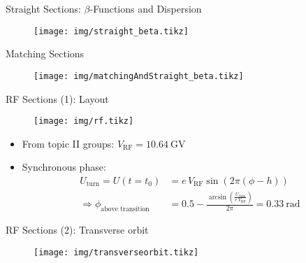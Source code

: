 \documentclass{beamer}
\begin{document}
\begin{frame}[t,fragile]{Straight Sections: $\beta$-Functions and Dispersion}
\begin{figure}
\centering
\texttt{[image: img/straight\_beta.tikz]}
\end{figure}
\end{frame}


\begin{frame}[t,fragile]{Matching Sections}
\begin{figure}
\centering
\texttt{[image: img/matchingAndStraight\_beta.tikz]}
\end{figure}
\end{frame}

\begin{frame}[t,fragile]{RF Sections (1): Layout}
\begin{figure}
\centering
\texttt{[image: img/rf.tikz]}
\end{figure}
\begin{itemize}
\item From topic II groups: $V_\text{RF}=\SI{10.64}{\giga\volt}$
\item Synchronous phase:
\begin{align*}
U_\text{turn} = U(t=t_0) &= e\,V_\text{RF} \sin\left(2\pi(\phi-h)\right)\\
\Rightarrow \phi_\text{above transition} &= 0.5 - \frac{\arcsin\left(\frac{U_\text{turn}}{e\,V_\text{RF}}\right)}{2\pi} = \SI{0.33}{\radian}
\end{align*}
\end{itemize}
\end{frame}

\begin{frame}[t,fragile]{RF Sections (2): Transverse orbit}
\begin{figure}
\centering
\texttt{[image: img/transverseorbit.tikz]}
\end{figure}
\end{frame}
\end{document}
